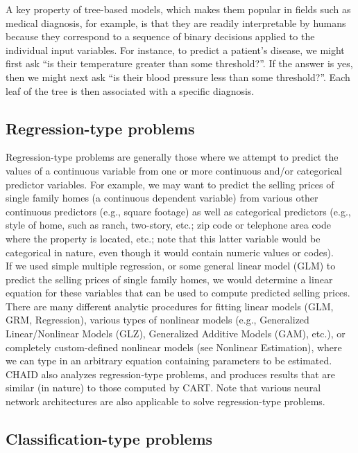 \documentclass[final, paper=letter,5p,times,twocolumn]{elsarticle}
\begin{document}
A key property of tree-based models, which makes them popular in fields such as medical diagnosis, for example, is that they are readily interpretable by humans because they correspond to a sequence of binary decisions applied to the individual input variables. For instance, to predict a patient's disease, we might first ask ``is their temperature greater than some threshold?''. If the answer is yes, then we might next ask ``is their blood pressure less than some threshold?''. Each leaf of the tree is then associated with a specific diagnosis. \\

\subsection{Regression-type problems}

Regression-type problems are generally those where we attempt to predict the values of a continuous variable from one or more continuous and/or categorical predictor variables. For example, we may want to predict the selling prices of single family homes (a continuous dependent variable) from various other continuous predictors (e.g., square footage) as well as categorical predictors (e.g., style of home, such as ranch, two-story, etc.; zip code or telephone area code where the property is located, etc.; note that this latter variable would be categorical in nature, even though it would contain numeric values or codes).\\
If we used simple multiple regression, or some general linear model (GLM) to predict the selling prices of single family homes, we would determine a linear equation for these variables that can be used to compute predicted selling prices. There are many different analytic procedures for fitting linear models (GLM, GRM, Regression), various types of nonlinear models (e.g., Generalized Linear/Nonlinear Models (GLZ), Generalized Additive Models (GAM), etc.), or completely custom-defined nonlinear models (see Nonlinear Estimation), where we can type in an arbitrary equation containing parameters to be estimated. CHAID also analyzes regression-type problems, and produces results that are similar (in nature) to those computed by CART. Note that various neural network architectures are also applicable to solve regression-type problems.

\subsection{Classification-type problems}
\end{document}
